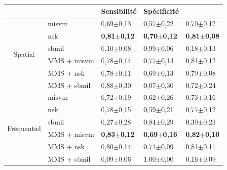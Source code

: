 \vspace{25pt}

\begin{table}[H]
    \centering
    \begin{tabular}{cllll}
        \toprule
        \multicolumn{1}{l}{}         &                      & Sensibilité               & Spécificité               & \Fscore{}                 \\ \midrule
        \multirow{6}{*}{Spatial}     & \gls{misvm}          & 0,69$\pm$0,13             & 0,57$\pm$0,22             & 0,70$\pm$0,12             \\
                                     & \gls{nsk}            & \textbf{0,81$\pm$0,12}    & \textbf{0,70$\pm$0,12}    & \textbf{0,81$\pm$0,08}    \\
                                     & \gls{sbmil}          & 0,10$\pm$0,08             & 0,99$\pm$0,06             & 0,18$\pm$0,13             \\
                                     & MMS + \gls{misvm}    & 0,78$\pm$0,14             & 0,77$\pm$0,14             & 0,81$\pm$0,12             \\
                                     & MMS + \gls{nsk}      & 0,78$\pm$0,11             & 0,69$\pm$0,13             & 0,79$\pm$0,08             \\
                                     & MMS + \gls{sbmil}    & 0,88$\pm$0,30             & 0,07$\pm$0,30             & 0,72$\pm$0,24             \\ \midrule
        \multirow{6}{*}{Fréquentiel} & \gls{misvm}          & 0,72$\pm$0,19             & 0,62$\pm$0,26             & 0,73$\pm$0,16             \\
                                     & \gls{nsk}            & 0,78$\pm$0,15             & 0,59$\pm$0,21             & 0,77$\pm$0,12             \\
                                     & \gls{sbmil}          & 0,27$\pm$0,28             & 0,84$\pm$0,29             & 0,39$\pm$0,23             \\
                                     & MMS + \gls{misvm}    & \textbf{0,83$\pm$0,12}    & \textbf{0,69$\pm$0,16}    & \textbf{0,82$\pm$0,10}    \\
                                     & MMS + \gls{nsk}      & 0,80$\pm$0,14             & 0,71$\pm$0,09             & 0,81$\pm$0,11             \\
                                     & MMS + \gls{sbmil}    & 0,09$\pm$0,06             & 1.00$\pm$0,00             & 0,16$\pm$0,09             \\ \midrule

\end{tabular}
\end{table}

